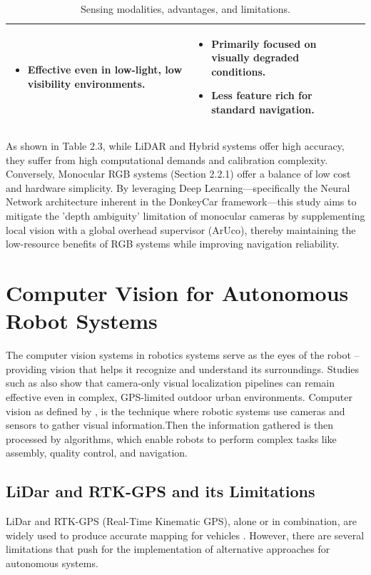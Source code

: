 \begin{table}[H]
\begin{tabular}{p{2.5cm} p{5cm} p{5cm}}
\begin{itemize}
  \item Effective even in low-light, low visibility environments.
\end{itemize} &
\begin{itemize}
  \item Primarily focused on visually degraded conditions.
  \item Less feature rich for standard navigation.
\end{itemize} \\
\hline
\end{tabular}
\caption{Sensing modalities, advantages, and limitations.}
\label{tab:sensing_modalities}
\end{table}

As shown in Table 2.3, while LiDAR and Hybrid systems offer high accuracy, they suffer from high computational demands and calibration complexity. Conversely, Monocular RGB systems (Section 2.2.1) offer a balance of low cost and hardware simplicity. By leveraging Deep Learning—specifically the Neural Network architecture inherent in the DonkeyCar framework—this study aims to mitigate the 'depth ambiguity' limitation of monocular cameras by supplementing local vision with a global overhead supervisor (ArUco), thereby maintaining the low-resource benefits of RGB systems while improving navigation reliability.

\section{Computer Vision for Autonomous Robot Systems}
The computer vision systems in robotics systems serve as the eyes of the robot – providing vision that helps it recognize and understand its surroundings. Studies such as \cite{Alimovski2022VisionUrbanLocalization} also show that camera-only visual localization pipelines can remain effective even in complex, GPS-limited outdoor urban environments. Computer vision as defined by \cite{Vina2023CVInRoboticsIntegration}, is the technique where robotic systems use cameras and sensors to gather visual information.Then the information gathered is then processed by algorithms, which enable robots to perform complex tasks like assembly, quality control, and navigation. 

\subsection{LiDar and RTK-GPS and its Limitations}
LiDar and RTK-GPS (Real-Time Kinematic GPS), alone or in combination, are widely used to produce accurate mapping for vehicles \citep{DeMiguel2020ImprovedLidarProbabilistic, Thepsit2023LidarRTKGNSSINS}. However, there are several limitations that push for the implementation of alternative approaches for autonomous systems.


